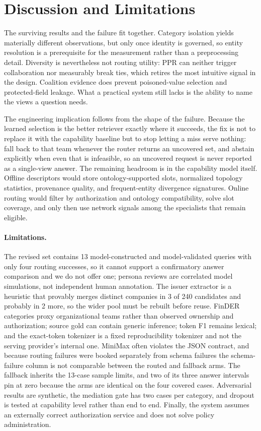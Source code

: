 \documentclass{article}
\begin{document}
\section{Discussion and Limitations}
The surviving results and the failure fit together. Category isolation yields materially different observations, but only once identity is governed, so entity resolution is a prerequisite for the measurement rather than a preprocessing detail. Diversity is nevertheless not routing utility: PPR can neither trigger collaboration nor measurably break ties, which retires the most intuitive signal in the design. Coalition evidence does prevent poisoned-value selection and protected-field leakage. What a practical system still lacks is the ability to name the views a question needs.

The engineering implication follows from the shape of the failure. Because the learned selection is the better retriever exactly where it succeeds, the fix is not to replace it with the capability baseline but to stop letting a miss serve nothing: fall back to that team whenever the router returns an uncovered set, and abstain explicitly when even that is infeasible, so an uncovered request is never reported as a single-view answer. The remaining headroom is in the capability model itself. Offline descriptors would store ontology-supported slots, normalized topology statistics, provenance quality, and frequent-entity divergence signatures. Online routing would filter by authorization and ontology compatibility, solve slot coverage, and only then use network signals among the specialists that remain eligible.

\paragraph{Limitations.} The revised set contains 13 model-constructed and model-validated queries with only four routing successes, so it cannot support a confirmatory answer comparison and we do not offer one; persona reviews are correlated model simulations, not independent human annotation. The issuer extractor is a heuristic that provably merges distinct companies in 3 of 240 candidates and probably in 2 more, so the wider pool must be rebuilt before reuse. FinDER categories proxy organizational teams rather than observed ownership and authorization; source gold can contain generic inference; token F1 remains lexical; and the exact-token tokenizer is a fixed reproducibility tokenizer and not the serving provider's internal one. MiniMax often violates the JSON contract, and because routing failures were booked separately from schema failures the schema-failure column is not comparable between the routed and fallback arms. The fallback inherits the 13-case sample limits, and two of its three answer intervals pin at zero because the arms are identical on the four covered cases. Adversarial results are synthetic, the mediation gate has two cases per category, and dropout is tested at capability level rather than end to end. Finally, the system assumes an externally correct authorization service and does not solve policy administration.
\end{document}
